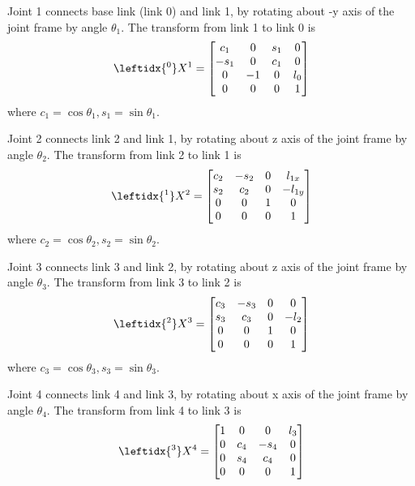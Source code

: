 \documentclass{article}
\begin{document}
Joint 1 connects base link (link 0) and link 1, by rotating about -y axis of the joint frame by angle $\theta_1$. The transform from link 1 to link 0 is
\begin{align}
\leftidx{^0}X^1 = \begin{bmatrix}c_1& 0 & s_1 & 0\\
                                -s_1& 0 & c_1 & 0\\
                                  0 & -1&  0  & l_0\\
                                  0 & 0 &  0  & 1\end{bmatrix}
\end{align}
where $c_1 = \cos\theta_1, s_1=\sin\theta_1$.

Joint 2 connects link 2 and link 1, by rotating about  z axis of the joint frame by angle $\theta_2$.  The transform from link 2 to link 1 is
\begin{align}
\leftidx{^1}X^2 = \begin{bmatrix}
	c_2 & -s_2 & 0  & l_{1x}\\
	s_2 & c_2  & 0  & -l_{1y}\\
	0   &  0   & 1  & 0\\
	0   & 0    & 0  & 1
		\end{bmatrix}
\end{align}
where $c_2 = \cos\theta_2, s_2 = \sin\theta_2$.

Joint 3 connects link 3 and link 2, by rotating about z axis of the joint frame by angle $\theta_3$. The transform from link 3 to link 2 is
\begin{align}
	\leftidx{^2}X^3 = \begin{bmatrix} 
		c_3 & -s_3 & 0 & 0\\
		s_3 &  c_3 & 0 & -l_2\\
		0 & 0 & 1 & 0\\
		0 & 0 & 0 & 1
	\end{bmatrix}
\end{align}
where $c_3 = \cos\theta_3, s_3 = \sin\theta_3$.

Joint 4 connects link 4 and link 3, by rotating about x axis of the joint frame by angle $\theta_4$. The transform from link 4 to link 3 is
\begin{align}
	\leftidx{^3}X^4 = \begin{bmatrix}
		1 & 0 & 0 & l_3\\
		0 & c_4 & -s_4 & 0\\
		0 & s_4 &  c_4 & 0\\
		0 & 0 & 0 & 1
	\end{bmatrix}
\end{align}
\end{document}
